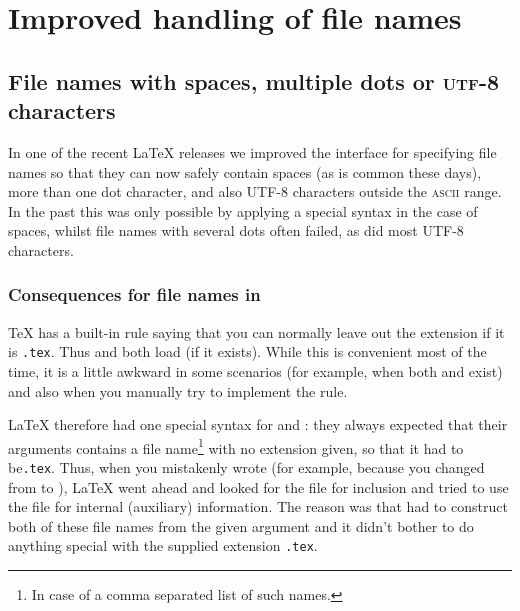 \documentclass{ltnews}
\providecommand\acro[1]{\textsc{#1}}
\begin{document}
\section{Improved handling of file names}



\subsection[File names with spaces, multiple dots or\\
            \acro{utf-8} characters]
           {File names with spaces, multiple dots or \acro{utf-8} characters}

In one of the recent \LaTeX{} releases we improved the interface
for specifying file names so that they can now safely contain spaces
(as is common these days),
more than one dot character, and also UTF-8 characters
outside the \acro{ascii} range. 
In the past this was only possible by applying a special syntax
in the case of spaces, 
whilst file names with several dots often failed, 
as did most UTF-8 characters.


\subsubsection{Consequences for file names in }

\TeX{} has a built-in rule saying that you can normally leave out the
extension if it is \texttt{.tex}.  Thus \verb== and
\verb== both load  (if it exists).
While this is convenient most of the time, it is a little awkward in
some scenarios (for example, when both  and 
exist) and also when you manually try to implement the rule.

\LaTeX{} therefore had one special syntax for  and
: they always expected that 
their arguments contains a
file name\footnote{In case of  a comma separated list of such names.} 
with no extension given,
  so that it had to be\texttt{.tex}.  Thus,
 when you mistakenly wrote
\verb== (for example,
because you changed from 
to ),
\LaTeX{} went ahead and looked for the
file  for inclusion and tried to
use the file  for internal (auxiliary) information.  The reason was that
 had to construct both
of these file names from the given
argument and it didn't bother to do
anything special
with the supplied 
extension \texttt{.tex}.
\end{document}
